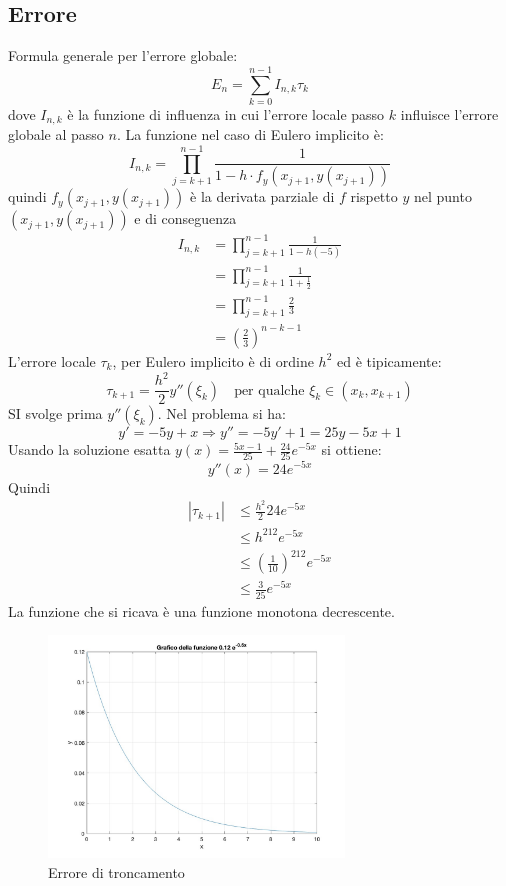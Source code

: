 \documentclass[11pt]{article}
\begin{document}
\subsection{Errore}
Formula generale per l'errore globale:
\[
E_n=\sum^{n-1}_{k=0}I_{n,k}\tau_k
\]
dove $I_{n,k}$ è la funzione di influenza in cui l'errore locale passo $k$ influisce l'errore globale al passo $n$. La funzione nel caso di Eulero implicito è:
\[
I_{n,k}=\prod^{n-1}_{j=k+1}\frac{1}{1-h\cdot f_y(x_{j+1},y(x_{j+1}))}
\]
quindi $f_y(x_{j+1},y(x_{j+1}))$ è la derivata parziale di $f$ rispetto $y$ nel punto $(x_{j+1},y(x_{j+1}))$ e di conseguenza
\begin{align}
	I_{n,k}&=\prod^{n-1}_{j=k+1}\frac{1}{1-h(-5)}\\
	&=\prod^{n-1}_{j=k+1}\frac{1}{1+ \frac{1}{2}}\\
	&=\prod^{n-1}_{j=k+1}\frac{2}{3}\\
	&=\left( \frac{2}{3}\right)^{n-k-1}
\end{align}
L'errore locale $\tau_k$, per Eulero implicito è di ordine $h^2$ ed è tipicamente:
\[
\tau_{k+1} = \frac{h^2}{2} y''(\xi_k) \quad \text{per qualche } \xi_k \in (x_k, x_{k+1})
\]
SI svolge prima $y''(\xi_k)$. Nel problema si ha:
\[
y'=-5y+x \Rightarrow y''=-5y'+1=25y-5x+1
\]
Usando la soluzione esatta $y(x)=\frac{5x-1}{25}+\frac{24}{25}e^{-5x}$ si ottiene:
\[
y''(x)=24e^{-5x}
\]
Quindi
\begin{align}
	|\tau_{k+1}|&\leq \frac{h^2}{2} 24e^{-5x}\\
	&\leq h^212e^{-5x}\\
	&\leq \left(\frac{1}{10}\right)^212e^{-5x}\\
	&\leq \frac{3}{25}e^{-5x}
\end{align}
La funzione che si ricava è una funzione monotona decrescente.
\begin{figure}[H]
  \centering
  \includegraphics[width=0.7\textwidth]{images/fig2.jpg} 
  \caption{Errore di troncamento}
  \label{fig:funzione}
\end{figure}
\end{document}
